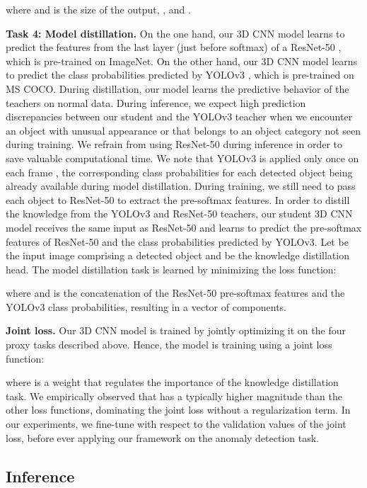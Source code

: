 \documentclass[final]{cvpr}
\begin{document}
where  and  is the size of the output, \ie ,  and .

\noindent
{\bf Task 4: Model distillation.}
On the one hand, our 3D CNN model learns to predict the features from the last layer (just before softmax) of a ResNet-50 \cite{He-CVPR-2016}, which is pre-trained on ImageNet. On the other hand, our 3D CNN model learns to predict the class probabilities predicted by YOLOv3 \cite{Redmon-arXiv-2018}, which is pre-trained on MS COCO. During distillation, our model learns the predictive behavior of the teachers on normal data. During inference, we expect high prediction discrepancies between our student and the YOLOv3 teacher when we encounter an object with unusual appearance or that belongs to an object category not seen during training. We refrain from using ResNet-50 during inference in order to save valuable computational time.
We note that YOLOv3 is applied only once on each frame , the corresponding class probabilities for each detected object being already available during model distillation. During training, we still need to pass each object to ResNet-50 to extract the pre-softmax features. In order to distill the knowledge from the YOLOv3 and ResNet-50 teachers, our student 3D CNN model receives the same input as ResNet-50 and learns to predict the pre-softmax features  of ResNet-50 and the class probabilities  predicted by YOLOv3. Let  be the input image comprising a detected object and  be the knowledge distillation head. The model distillation task is learned by minimizing the  loss function:

where  and  is the concatenation of the  ResNet-50 pre-softmax features and the  YOLOv3 class probabilities, resulting in a vector of  components. 

\noindent
{\bf Joint loss.}
Our 3D CNN model is trained by jointly optimizing it on the four proxy tasks described above. Hence, the model is training using a joint loss function:

where  is a weight that regulates the importance of the knowledge distillation task. We empirically observed that  has a typically higher magnitude than the other loss functions, dominating the joint loss without a regularization term. In our experiments, we fine-tune  with respect to the validation values of the joint loss, before ever applying our framework on the anomaly detection task.



\vspace*{-0.1cm}
\subsection{Inference}
\vspace*{-0.1cm}
\end{document}
